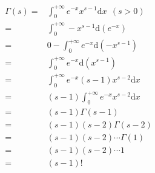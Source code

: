 \documentclass{article}
\begin{document}
	\large
	\setlength{\baselineskip}{3em}
	$$
	\renewcommand{\d}[1][x]{\text{d}#1}
	\newcommand{\intinf}{\int_{0}^{+\infty}}
	\begin{aligned}
		\Gamma(s) =& \intinf e^{-x} x^{s-1} \d \ \ (s > 0)
		\\
		=& \intinf -x^{s-1} \d[(e^{-x})]
		\\
		=& 0 - \intinf e^{-x} \d[(-x^{s-1})]
		\\
		=& \intinf e^{-x} \d[(x^{s-1})]
		\\
		=& \intinf e^{-x} (s - 1) x^{s-2} \d
		\\
		=& (s - 1) \intinf e^{-x} x^{s-2} \d
		\\
		=& (s - 1) \Gamma(s - 1)
		\\
		=& (s - 1) (s - 2) \Gamma(s - 2)
		\\
		=& (s - 1) (s - 2) \cdots \Gamma(1)
		\\
		=& (s - 1) (s - 2) \cdots 1
		\\
		=& (s - 1)!
	\end{aligned}
	$$
\end{document}
